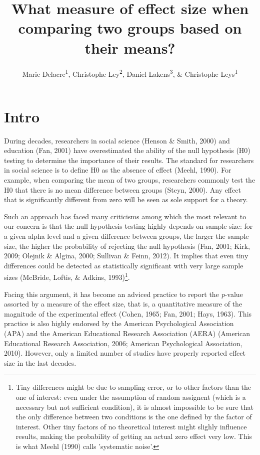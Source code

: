 \documentclass[
  man,floatsintext]{apa6}
\affiliation{
\vspace{0.5cm}
\textsuperscript{1} Université Libre de Bruxelles, Service of Analysis of the Data (SAD), Bruxelles, Belgium\\\textsuperscript{2} Universiteit Gent, Department of Applied Mathematics, Computer Science and Statistics,4 Gent, Belgium\\\textsuperscript{3} Eindhoven University of Technology, Human Technology Interaction Group, Eindhoven, the Netherlands}
\title{What measure of effect size when comparing two groups based on their means?}
\author{Marie Delacre\textsuperscript{1}, Christophe Ley\textsuperscript{2}, Daniel Lakens\textsuperscript{3}, \& Christophe Leys\textsuperscript{1}}
\date{}
\begin{document}
\maketitle

\hypertarget{intro}{%
\section{Intro}\label{intro}}

During decades, researchers in social science (Henson \& Smith, 2000) and education (Fan, 2001) have overestimated the ability of the null hypothesis (H0) testing to determine the importance of their results. The standard for researchers in social science is to define H0 as the absence of effect (Meehl, 1990). For example, when comparing the mean of two groups, researchers commonly test the H0 that there is no mean difference between groups (Steyn, 2000). Any effect that is significantly different from zero will be seen as sole support for a theory.

Such an approach has faced many criticisms among which the most relevant to our concern is that the null hypothesis testing highly depends on sample size: for a given alpha level and a given difference between groups, the larger the sample size, the higher the probability of rejecting the null hypothesis (Fan, 2001; Kirk, 2009; Olejnik \& Algina, 2000; Sullivan \& Feinn, 2012). It implies that even tiny differences could be detected as statistically significant with very large sample sizes (McBride, Loftis, \& Adkins, 1993)\footnote{Tiny differences might be due to sampling error, or to other factors than the one of interest: even under the assumption of random assignent (which is a necessary but not sufficient condition), it is almost impossible to be sure that the only difference between two conditions is the one defined by the factor of interest. Other tiny factors of no theoretical interest might slighly influence results, making the probability of getting an actual zero effect very low. This is what Meehl (1990) calls 'systematic noise'.}.

Facing this argument, it has become an adviced practice to report the \emph{p}-value assorted by a measure of the effect size, that is, a quantitative measure of the magnitude of the experimental effect (Cohen, 1965; Fan, 2001; Hays, 1963). This practice is also highly endorsed by the American Psychological Association (APA) and the American Educational Research Association (AERA) (American Educational Research Association, 2006; American Psychological Association, 2010). However, only a limited number of studies have properly reported effect size in the last decades.
\end{document}

